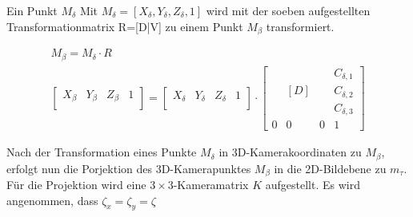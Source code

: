 Ein Punkt $M_\delta$ Mit $M_\delta=[X_\delta,Y_\delta,Z_\delta,1]$ wird mit der soeben aufgestellten Transformationmatrix R=[D|V] zu einem Punkt $M_\beta$ transformiert.

\begin{gather}
M_\beta = M_\delta \cdot R\\
\begin{bmatrix}
X_\beta& Y_\beta& Z_\beta&1\\
\end{bmatrix} = 
\begin{bmatrix}
X_\delta& Y_\delta& Z_\delta&1\\
\end{bmatrix} \cdot
\begin{bmatrix}
	&  &  &C_{\delta,1} \\
	&  [D]&  &C_{\delta,2} \\ 
	&  &  &C_{\delta,3} \\
	0&0&0 & 1
\end{bmatrix}	
\end{gather}


Nach der Transformation eines Punkte $M_\delta$ in 3D-Kamerakoordinaten zu $M_\beta$, erfolgt nun die Porjektion des 3D-Kamerapunktes $M_\beta$ in die 2D-Bildebene zu $m_\tau$. Für die Projektion wird eine $3 \times 3$-Kameramatrix $K$ aufgestellt.  Es wird angenommen, dass $\zeta_x = \zeta_y =\zeta$

